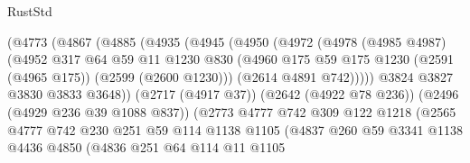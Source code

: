 \begin{lexlean}{RustStd}
\begin{coremodule}
                        (@4773
                          (@4867
                            (@4885
                              (@4935
                                (@4945
                                  (@4950
                                    (@4972
                                      (@4978
                                        (@4985 @4987)
                                        (@4952
                                          @317
                                          @64
                                          @59
                                          @11
                                          @1230
                                          @830
                                          (@4960
                                            @175
                                            @59
                                            @175
                                            @1230
                                            (@2591 (@4965 @175))
                                            (@2599 (@2600 @1230)))
                                          (@2614 @4891 @742)))))
                                  @3824
                                  @3827
                                  @3830
                                  @3833
                                  @3648))
                              (@2717 (@4917 @37))
                              (@2642 (@4922 @78 @236))
                              (@2496 (@4929 @236 @39 @1088 @837))
                              (@2773
                                @4777
                                @742
                                @309
                                @122
                                @1218
                                (@2565
                                  @4777
                                  @742
                                  @230
                                  @251
                                  @59
                                  @114
                                  @1138
                                  @1105
                                  (@4837
                                    @260
                                    @59
                                    @3341
                                    @1138
                                    @4436
                                    @4850
                                    (@4836
                                      @251
                                      @64
                                      @114
                                      @11
                                      @1105

\end{coremodule}
\end{lexlean}
